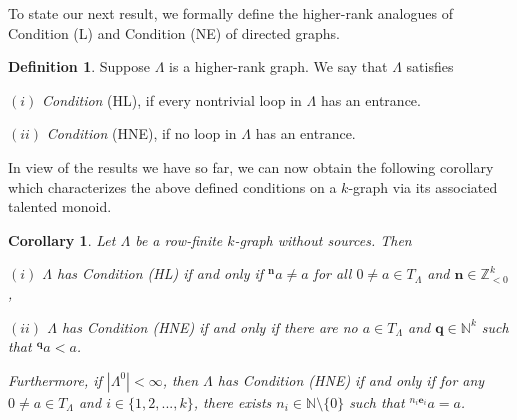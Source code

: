\documentclass[a4paper,reqno,12pt]{amsart}
\numberwithin{equation}{section}
\newtheorem{cor}[thm]{Corollary}
\theoremstyle{definition}
\newtheorem{dfn}[thm]{Definition}
\theoremstyle{remark}
\newcommand{\N}{\mathbf{n}}
\begin{document}
To state our next result, we formally define the higher-rank analogues of Condition (L) and Condition (NE) of directed graphs. 
\begin{dfn}\label{def condition L and NE in higher-dimension}
Suppose $\Lambda$ is a higher-rank graph. We say that $\Lambda$ satisfies 

$(i)$ \emph{Condition} (HL), if every nontrivial loop in $\Lambda$ has an entrance.

$(ii)$ \emph{Condition} (HNE), if no loop in $\Lambda$ has an entrance. 
\end{dfn}
In view of the results we have so far, we can now obtain the following corollary which characterizes the above defined conditions on a $k$-graph via its associated talented monoid.
\begin{cor}\label{cor characterizing HL and HNE via TM}
Let $\Lambda$ be a row-finite $k$-graph without sources. Then

$(i)$ $\Lambda$ has Condition \textup{(HL)} if and only if $^\N a\neq a$ for all $0\neq a\in T_\Lambda$ and $\N\in \mathbb{Z}_{<0}^k$,

$(ii)$ $\Lambda$ has Condition \textup{(HNE)} if and only if there are no $a\in T_\Lambda$ and $\mathbf{q}\in \mathbb{N}^k$ such that $^\mathbf{q} a< a$.

Furthermore, if $|\Lambda^0|<\infty$, then $\Lambda$ has Condition \textup{(HNE)}  if and only if for any $0\neq a\in T_\Lambda$ and $i\in \{1,2,...,k\}$, there exists $n_i\in \mathbb{N}\setminus \{0\}$ such that $^{n_i \mathbf{e}_i} a=a$.
\end{cor}
\end{document}
